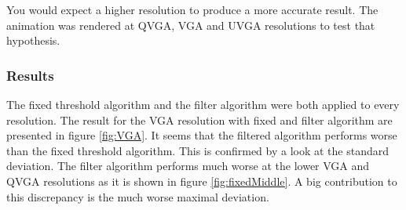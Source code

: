 You would expect a higher resolution to produce a more accurate result. The animation was rendered at QVGA, VGA and UVGA resolutions to test that hypothesis. 
\subsubsection{Results}

The fixed threshold algorithm and the filter algorithm were both applied to every resolution. The result for the VGA resolution with fixed and filter algorithm are presented in figure \ref{fig:VGA}. It seems that the filtered algorithm performs worse than the fixed threshold algorithm. This is confirmed by a look at the standard deviation. The filter algorithm performs much worse at the lower VGA and QVGA resolutions as it is shown in figure \ref{fig:fixedMiddle}. A big contribution  to this discrepancy is the much worse maximal deviation. 


